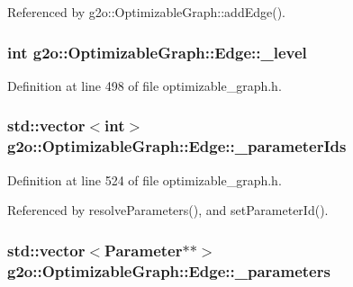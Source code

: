 Referenced by g2o\+::\+Optimizable\+Graph\+::add\+Edge().

\subsubsection[{\texorpdfstring{\+\_\+level}{_level}}]{\setlength{\rightskip}{0pt plus 5cm}int g2o\+::\+Optimizable\+Graph\+::\+Edge\+::\+\_\+level\hspace{0.3cm}{\ttfamily [protected]}}\hypertarget{classg2o_1_1OptimizableGraph_1_1Edge_a57132078028dd0455aef141e62e07db9}{}\label{classg2o_1_1OptimizableGraph_1_1Edge_a57132078028dd0455aef141e62e07db9}


Definition at line 498 of file optimizable\+\_\+graph.\+h.

\subsubsection[{\texorpdfstring{\+\_\+parameter\+Ids}{_parameterIds}}]{\setlength{\rightskip}{0pt plus 5cm}std\+::vector$<$int$>$ g2o\+::\+Optimizable\+Graph\+::\+Edge\+::\+\_\+parameter\+Ids\hspace{0.3cm}{\ttfamily [protected]}}\hypertarget{classg2o_1_1OptimizableGraph_1_1Edge_a33a35663ba5b096cb6e6078014bd6f17}{}\label{classg2o_1_1OptimizableGraph_1_1Edge_a33a35663ba5b096cb6e6078014bd6f17}


Definition at line 524 of file optimizable\+\_\+graph.\+h.



Referenced by resolve\+Parameters(), and set\+Parameter\+Id().

\subsubsection[{\texorpdfstring{\+\_\+parameters}{_parameters}}]{\setlength{\rightskip}{0pt plus 5cm}std\+::vector$<${\bf Parameter}$\ast$$\ast$$>$ g2o\+::\+Optimizable\+Graph\+::\+Edge\+::\+\_\+parameters\hspace{0.3cm}{\ttfamily [protected]}}\hypertarget{classg2o_1_1OptimizableGraph_1_1Edge_a41c4d6a404d0b057d37fac43edec40ed}{}\label{classg2o_1_1OptimizableGraph_1_1Edge_a41c4d6a404d0b057d37fac43edec40ed}


